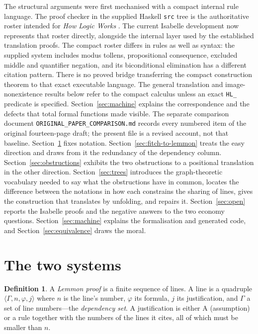 \documentclass[11pt]{article}
\theoremstyle{plain}
\theoremstyle{definition}
\newtheorem{definition}[theorem]{Definition}
\theoremstyle{remark}
\begin{document}
The structural arguments were first mechanised with a compact internal rule
language. The proof checker in the supplied Haskell \verb|src| tree is the
authoritative roster intended for \emph{How Logic Works}
\cite{halvorson2020}. The current Isabelle development now represents that
roster directly, alongside the internal layer used by the established
translation proofs. The compact roster differs in rules as well as syntax:
the supplied system includes modus tollens, propositional consequence,
excluded middle and quantifier negation, and its biconditional elimination has
a different citation pattern. There is no proved bridge transferring the
compact construction theorem to that exact executable language.
The general translation and image-nonexistence results below refer to the
compact calculus unless an exact \verb|HL_| predicate is specified.
Section~\ref{sec:machine} explains the correspondence and the defects that
total formal functions made visible. The separate comparison document
\verb|ORIGINAL_PAPER_COMPARISON.md| records every numbered item of the original
fourteen-page draft; the present file is a revised account, not that baseline.
Section~\ref{sec:systems} fixes notation.
Section~\ref{sec:fitch-to-lemmon} treats the easy direction and
draws from it the redundancy of the dependency column.
Section~\ref{sec:obstructions} exhibits the two obstructions to a positional
translation in the other direction. Section~\ref{sec:trees} introduces the
graph-theoretic vocabulary needed to say what the obstructions have in common,
locates the difference between the notations in how each constrains the
sharing of lines, gives the construction that translates by unfolding, and
repairs it. Section~\ref{sec:open} reports the Isabelle proofs and the negative
answers to the two economy questions. Section~\ref{sec:machine} explains the
formalisation and generated code, and
Section~\ref{sec:equivalence} draws the moral.

\section{The two systems}\label{sec:systems}

\begin{definition}
A \emph{Lemmon proof} is a finite sequence of lines. A line is a quadruple
$\langle \Gamma, n, \varphi, j\rangle$ where $n$ is the line's number,
$\varphi$ its formula, $j$ its justification, and $\Gamma$ a set of line
numbers---the \emph{dependency set}. A justification is either
$\mathrm{A}$ (assumption) or a rule together with the numbers of the lines it
cites, all of which must be smaller than $n$.
\end{definition}
\end{document}
